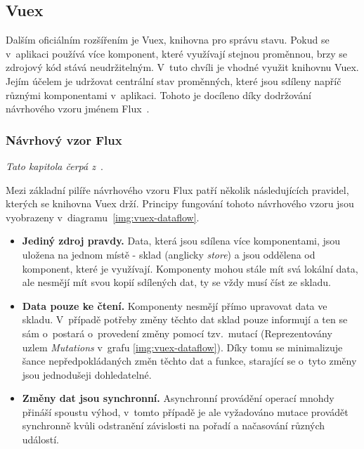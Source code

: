 \subsection{Vuex}
Dalším oficiálním rozšířením je Vuex, knihovna pro správu stavu. Pokud se v~aplikaci používá více komponent, které využívají stejnou proměnnou, brzy se zdrojový kód stává neudržitelným. 
V~tuto chvíli je vhodné využit knihovnu Vuex. Jejím účelem je udržovat centrální stav proměnných, které jsou sdíleny napříč různými komponentami v~aplikaci. Tohoto je docíleno díky dodržování návrhového vzoru jménem Flux~\cite{bib:vuex-doc}. 


\subsubsection*{Návrhový vzor Flux}
\emph{Tato kapitola čerpá z~\cite{bib:vuex-guide}}.

Mezi základní pilíře návrhového vzoru Flux patří několik následujících pravidel, kterých se knihovna Vuex drží. Principy fungování tohoto návrhového vzoru jsou vyobrazeny v~diagramu~\ref{img:vuex-dataflow}.

\begin{itemize}
    \item \textbf{Jediný zdroj pravdy.} Data, která jsou sdílena více komponentami, jsou uložena na jednom místě - sklad (anglicky \emph{store}) a jsou oddělena od komponent, které je využívají. Komponenty mohou stále mít svá lokální data, ale nesmějí mít svou kopií sdílených dat, ty se vždy musí číst ze skladu.
    \item \textbf{Data pouze ke čtení.} Komponenty nesmějí přímo upravovat data ve skladu. V~případě potřeby změny těchto dat sklad pouze informují a ten se sám o~postará o~provedení změny pomocí tzv.~mutací (Reprezentovány uzlem \emph{Mutations} v~grafu \ref{img:vuex-dataflow}). Díky tomu se minimalizuje šance nepředpokládaných změn těchto dat a funkce, starající se o~tyto změny jsou jednodušeji dohledatelné.
    \item \textbf{Změny dat jsou synchronní.} Asynchronní provádění operací mnohdy přináší spoustu výhod, v~tomto případě je ale vyžadováno mutace provádět synchronně kvůli odstranění závislosti na pořadí a načasování různých událostí.
\end{itemize}

